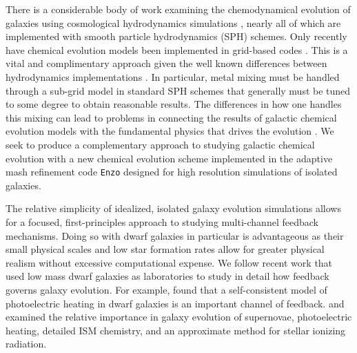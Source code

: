 \documentclass[twocolumn]{aastex61}
\begin{document}
There is a considerable body of work examining the chemodynamical evolution of galaxies using cosmological hydrodynamics simulations \citep[e.g.][]{Lia2002,KawataGibson2003,Kobayashi2004,Tornatore2004,Romeo2005,OppenheimerDave2008,Wiersma2009,Shen2010,MUGS2010,ErisSimulation,Brook2014,Snaith2015,Oppenheimer2016,OWLS,EAGLE,FIRE}, nearly all of which are implemented with smooth particle hydrodynamics (SPH) schemes. Only recently have chemical evolution models been implemented in grid-based codes \citep{Few2012,Few2014,Vorobyov2015}. This is a vital and complimentary approach given the well known differences between hydrodynamics implementations \citep[e.g][]{Agertz2007,AGORA,AGORA2}. In particular, metal mixing must be handled through a sub-grid model in standard SPH schemes \citep[e.g.][]{Shen2010} that generally must be tuned to some degree to obtain reasonable results. The differences in how one handles this mixing can lead to problems in connecting the results of galactic chemical evolution models with the fundamental physics that drives the evolution \citep{Revaz2016}. We seek to produce a complementary approach to studying galactic chemical evolution with a new chemical evolution scheme implemented in the adaptive mash refinement code \texttt{Enzo} designed for high resolution simulations of isolated galaxies. 

The relative simplicity of idealized, isolated galaxy evolution simulations allows for a focused, first-principles approach to studying multi-channel feedback mechanisms. Doing so with dwarf galaxies in particular is advantageous as their small physical scales and low star formation rates allow for greater physical realism without excessive computational expense. 
We follow recent work that used low mass dwarf galaxies as laboratories to study in detail how feedback governs galaxy evolution. For example, \citet{Forbes2016} found that a self-consistent model of photoelectric heating in dwarf galaxies is an important channel of feedback. \citet{Hu2016} and \citet{Hu2017} examined the relative importance in galaxy evolution of supernovae, photoelectric heating, detailed ISM chemistry, and an approximate method for stellar ionizing radiation.
\end{document}
